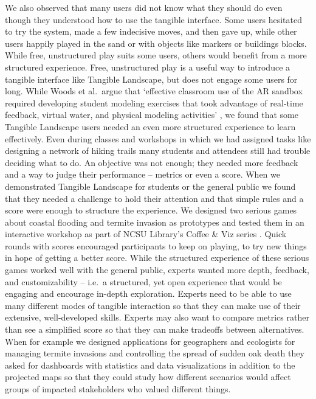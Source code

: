 \documentclass[prodmode,acmtochi]{acmsmall} %
\begin{document}
We also observed that many users
did not know what they should do 
even though they understood 
how to use the tangible interface. 
%
Some users hesitated to try the system,
made a few indecisive moves, 
and then gave up,
while other users happily played in the sand 
or with objects like markers or buildings blocks. 
%
While free, unstructured play suits some users,
others would benefit from a more structured experience. 
%
Free, unstructured play is a useful way
to introduce a tangible interface like Tangible Landscape,
but does not engage some users for long.
%
While
Woods et al.~argue that 
`effective classroom use of the AR sandbox required
developing student modeling exercises that took advantage 
of real-time feedback, virtual water, and physical modeling activities'
\cite{Woods2016},
we found that some Tangible Landscape users needed 
an even more structured experience
to learn effectively.
%
Even during classes and workshops
in which we had assigned tasks
like designing a network of hiking trails 
many students and attendees 
still had trouble deciding what to do. 
%
An objective was not enough; 
they needed more feedback 
and a way to judge their performance 
-- metrics or even a score. 
%
When we demonstrated Tangible Landscape 
for students or the general public
we found that they needed 
a challenge to hold their attention and 
that simple rules and a score were enough
to structure the experience. 
%
We designed two serious games 
about coastal flooding and termite invasion as prototypes
and tested them in an interactive workshop 
as part of NCSU Library's Coffee \& Viz series
\cite{Harmon2016d}.
%
Quick rounds with scores encouraged participants to 
keep on playing, to try new things in hope of getting a better score.
%
While the structured experience of these serious games
worked well with the general public,
experts wanted more depth, feedback, and customizability 
-- i.e.~a structured, yet open experience
that would be engaging and 
encourage in-depth exploration.
%
Experts need to be able to 
use many different modes of tangible interaction
so that they can make use of their 
extensive, well-developed skills.
%
Experts may also want to compare metrics 
rather than see a simplified score
so that they can make tradeoffs between alternatives.
%
When for example 
we designed applications for geographers and ecologists 
for managing termite invasions 
and controlling the spread of sudden oak death
they asked for dashboards with statistics and data visualizations 
in addition to the projected maps
so that they could study how different scenarios would affect 
groups of impacted stakeholders who valued different things.  
\end{document}
